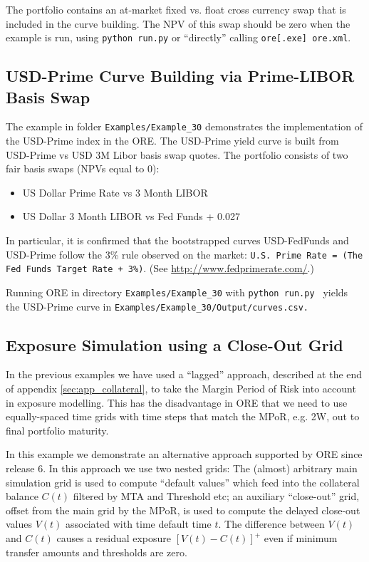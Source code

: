 \documentclass[12pt, a4paper]{article}
\begin{document}
{The portfolio contains an at-market fixed vs. float cross currency swap that is 
included in the curve building. The NPV of this swap should be zero when the example is run,
using {\tt python run.py} or ``directly'' calling {\tt ore[.exe] ore.xml}.

\subsection{USD-Prime Curve Building via Prime-LIBOR Basis Swap}%
\label{example:30}

The example in folder {\tt Examples/Example\_30} demonstrates the implementation of the USD-Prime index in the ORE.
The USD-Prime yield curve is built from USD-Prime vs USD 3M Libor basis swap quotes.
The portfolio consists of two fair basis swaps (NPVs equal to 0):
\begin{itemize}
\item US Dollar Prime Rate vs 3 Month LIBOR
\item US Dollar 3 Month LIBOR vs Fed Funds + 0.027
\end{itemize}

In particular, it is confirmed that the bootstrapped curves USD-FedFunds and USD-Prime follow
the 3\% rule observed on the market: {\tt U.S. Prime Rate = (The Fed Funds Target Rate + 3\%)}.
(See \url{http://www.fedprimerate.com/}.)

Running ORE in directory {\tt Examples/Example\_30} with {\tt python run.py }
yields the USD-Prime curve in {\tt Examples/Example\_30/Output/curves.csv.}

\subsection{Exposure Simulation using a Close-Out Grid}%
\label{example:31}

In the previous examples we have used a ``lagged'' approach, described at the end of appendix \ref{sec:app_collateral}, to take the Margin Period of Risk into account in exposure modelling. This has the disadvantage in ORE that we need to use equally-spaced time grids with time steps that match the MPoR, e.g. 2W, out to final portfolio maturity. 

In this example we demonstrate an alternative approach supported by ORE since release 6. In this approach we use two nested grids: The (almost) arbitrary main simulation grid is used to compute ``default values'' which feed into the collateral balance $C(t)$ filtered by MTA and Threshold etc; an auxiliary ``close-out'' grid, offset from the main grid by the MPoR, is used to compute the delayed close-out values $V(t)$ associated with time default time $t$. The difference between $V(t)$ and $C(t)$ causes a residual exposure $[V(t)-C(t)]^+$ even if minimum transfer amounts and thresholds are zero.

}
\end{document}
